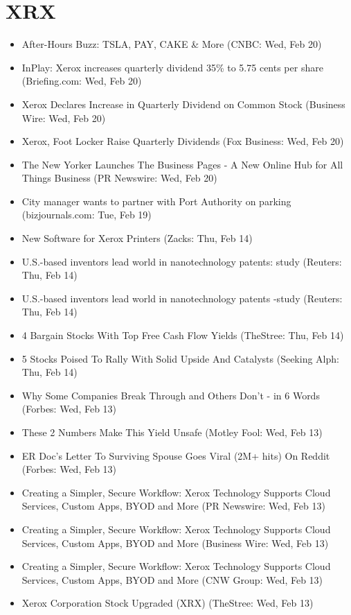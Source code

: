 \documentclass[11pt,asymmetric]{article}
\begin{document}
\section*{XRX}
\begin{itemize}
\item After-Hours Buzz: TSLA, PAY, CAKE \& More (CNBC: Wed, Feb 20)
\item InPlay: Xerox increases quarterly dividend 35\% to 5.75 cents per share (Briefing.com: Wed, Feb 20)
\item Xerox Declares Increase in Quarterly Dividend on Common Stock (Business Wire: Wed, Feb 20)
\item Xerox, Foot Locker Raise Quarterly Dividends (Fox Business: Wed, Feb 20)
\item The New Yorker Launches The Business Pages - A New Online Hub for All Things Business (PR Newswire: Wed, Feb 20)
\item City manager wants to partner with Port Authority on parking (bizjournals.com: Tue, Feb 19)
\item New Software for Xerox Printers (Zacks: Thu, Feb 14)
\item U.S.-based inventors lead world in nanotechnology patents: study (Reuters: Thu, Feb 14)
\item U.S.-based inventors lead world in nanotechnology patents -study (Reuters: Thu, Feb 14)
\item 4 Bargain Stocks With Top Free Cash Flow Yields (TheStree: Thu, Feb 14)
\item 5 Stocks Poised To Rally With Solid Upside And Catalysts (Seeking Alph: Thu, Feb 14)
\item Why Some Companies Break Through and Others Don't - in 6 Words (Forbes: Wed, Feb 13)
\item These 2 Numbers Make This Yield Unsafe (Motley Fool: Wed, Feb 13)
\item ER Doc's Letter To Surviving Spouse Goes Viral (2M+ hits) On Reddit (Forbes: Wed, Feb 13)
\item Creating a Simpler, Secure Workflow: Xerox Technology Supports Cloud Services, Custom Apps, BYOD and More (PR Newswire: Wed, Feb 13)
\item Creating a Simpler, Secure Workflow: Xerox Technology Supports Cloud Services, Custom Apps, BYOD and More (Business Wire: Wed, Feb 13)
\item Creating a Simpler, Secure Workflow: Xerox Technology Supports Cloud Services, Custom Apps, BYOD and More (CNW Group: Wed, Feb 13)
\item Xerox Corporation Stock Upgraded (XRX) (TheStree: Wed, Feb 13)

\end{itemize}
\end{document}
